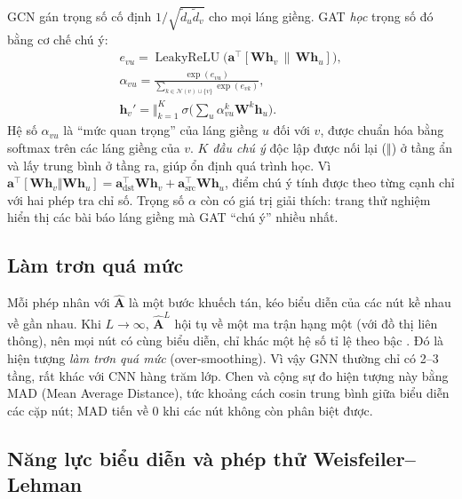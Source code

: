 GCN gán trọng số cố định $1/\sqrt{\tilde d_u\tilde d_v}$ cho mọi láng giềng. GAT \cite{velickovic2018} \emph{học} trọng số đó bằng cơ chế chú ý:
\begin{equation}
\begin{gathered}
e_{vu} = \operatorname{LeakyReLU}\!\big(\mathbf a^\top[\mathbf W\mathbf h_v\,\|\,\mathbf W\mathbf h_u]\big), \\
\alpha_{vu} = \frac{\exp(e_{vu})}{\sum_{k\in\mathcal N(v)\cup\{v\}}\exp(e_{vk})}, \\
\mathbf h_v' = \Big\Vert_{k=1}^{K}\ \sigma\Big(\sum_{u}\alpha^{k}_{vu}\mathbf W^{k}\mathbf h_u\Big).
\end{gathered}
\label{eq:gat}
\end{equation}
Hệ số $\alpha_{vu}$ là ``mức quan trọng'' của láng giềng $u$ đối với $v$, được chuẩn hóa bằng softmax trên các láng giềng của $v$. $K$ \emph{đầu chú ý} độc lập được nối lại ($\Vert$) ở tầng ẩn và lấy trung bình ở tầng ra, giúp ổn định quá trình học. Vì $\mathbf a^\top[\mathbf W\mathbf h_v\Vert\mathbf W\mathbf h_u] = \mathbf a_{\text{dst}}^\top\mathbf W\mathbf h_v + \mathbf a_{\text{src}}^\top\mathbf W\mathbf h_u$, điểm chú ý tính được theo từng cạnh chỉ với hai phép tra chỉ số. Trọng số $\alpha$ còn có giá trị giải thích: trang thử nghiệm hiển thị các bài báo láng giềng mà GAT ``chú ý'' nhiều nhất.

\subsection{Làm trơn quá mức}
\label{sec:oversmooth}

Mỗi phép nhân với $\hat{\mathbf A}$ là một bước khuếch tán, kéo biểu diễn của các nút kề nhau về gần nhau. Khi $L\to\infty$, $\hat{\mathbf A}^L$ hội tụ về một ma trận hạng một (với đồ thị liên thông), nên mọi nút có cùng biểu diễn, chỉ khác một hệ số tỉ lệ theo bậc \cite{li2018deeper}. Đó là hiện tượng \emph{làm trơn quá mức} (over-smoothing). Vì vậy GNN thường chỉ có 2–3 tầng, rất khác với CNN hàng trăm lớp. Chen và cộng sự \cite{chen2020mad} đo hiện tượng này bằng MAD (Mean Average Distance), tức khoảng cách cosin trung bình giữa biểu diễn các cặp nút; MAD tiến về 0 khi các nút không còn phân biệt được.

\subsection{Năng lực biểu diễn và phép thử Weisfeiler–Lehman}

